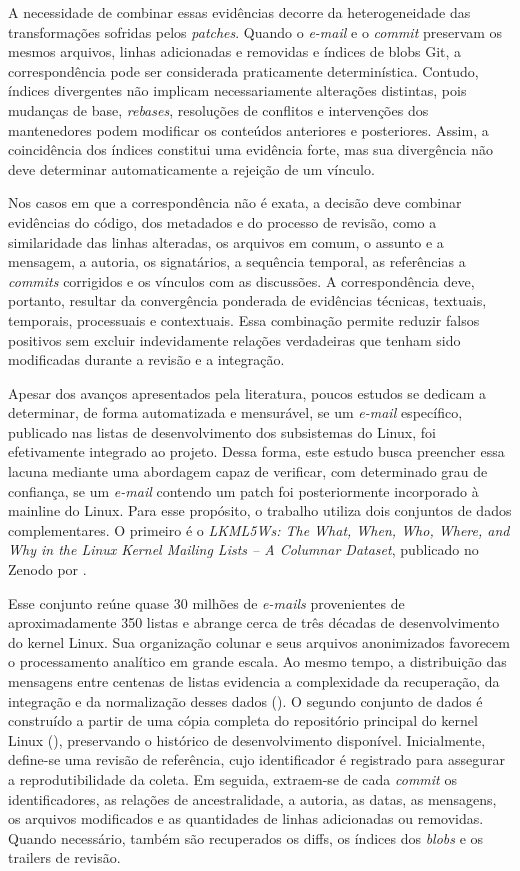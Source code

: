A necessidade de combinar essas evidências decorre da heterogeneidade das transformações sofridas pelos \textit{patches}. Quando o \textit{e-mail} e o \textit{commit} preservam os mesmos arquivos, linhas adicionadas e removidas e índices de blobs Git, a correspondência pode ser considerada praticamente determinística. Contudo, índices divergentes não implicam necessariamente alterações distintas, pois mudanças de base, \textit{rebases}, resoluções de conflitos e intervenções dos mantenedores podem modificar os conteúdos anteriores e posteriores. Assim, a coincidência dos índices constitui uma evidência forte, mas sua divergência não deve determinar automaticamente a rejeição de um vínculo.

Nos casos em que a correspondência não é exata, a decisão deve combinar evidências do código, dos metadados e do processo de revisão, como a similaridade das linhas alteradas, os arquivos em comum, o assunto e a mensagem, a autoria, os signatários, a sequência temporal, as referências a \textit{commits} corrigidos e os vínculos com as discussões. A correspondência deve, portanto, resultar da convergência ponderada de evidências técnicas, textuais, temporais, processuais e contextuais. Essa combinação permite reduzir falsos positivos sem excluir indevidamente relações verdadeiras que tenham sido modificadas durante a revisão e a integração.

Apesar dos avanços apresentados pela literatura, poucos estudos se dedicam a determinar, de forma automatizada e mensurável, se um \textit{e-mail} específico, publicado nas listas de desenvolvimento dos subsistemas do Linux, foi efetivamente integrado ao projeto. Dessa forma, este estudo busca preencher essa lacuna mediante uma abordagem capaz de verificar, com determinado grau de confiança, se um \textit{e-mail} contendo um patch foi posteriormente incorporado à mainline do Linux.
Para esse propósito, o trabalho utiliza dois conjuntos de dados complementares. O primeiro é o \textit{LKML5Ws: The What, When, Who, Where, and Why in the Linux Kernel Mailing Lists – A Columnar Dataset}, publicado no Zenodo por \cite{passos2026lkml5ws}. 

Esse conjunto reúne quase 30 milhões de \textit{e-mails} provenientes de aproximadamente 350 listas e abrange cerca de três décadas de desenvolvimento do kernel Linux. Sua organização colunar e seus arquivos anonimizados favorecem o processamento analítico em grande escala. Ao mesmo tempo, a distribuição das mensagens entre centenas de listas evidencia a complexidade da recuperação, da integração e da normalização desses dados (\cite{passos2026lkml5ws}). 
O segundo conjunto de dados é construído a partir de uma cópia completa do repositório principal do kernel Linux (\cite{torvalds_linux_source}), preservando o histórico de desenvolvimento disponível. Inicialmente, define-se uma revisão de referência, cujo identificador é registrado para assegurar a reprodutibilidade da coleta. Em seguida, extraem-se de cada \textit{commit} os identificadores, as relações de ancestralidade, a autoria, as datas, as mensagens, os arquivos modificados e as quantidades de linhas adicionadas ou removidas. Quando necessário, também são recuperados os diffs, os índices dos \textit{blobs} e os trailers de revisão.

